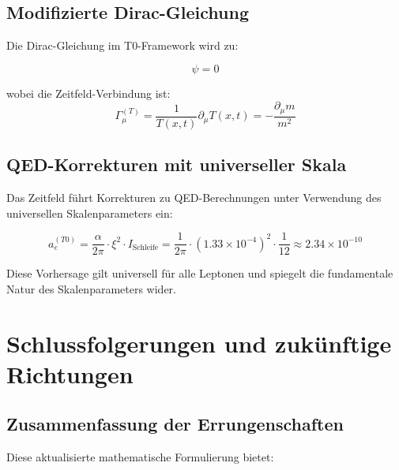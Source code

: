 \documentclass[12pt,a4paper]{article}
\newcommand{\Tfield}{T(x,t)}
\newcommand{\xipar}{\xi}
\theoremstyle{definition}
\theoremstyle{remark}
\begin{document}
	\subsection{Modifizierte Dirac-Gleichung}
	\label{subsec:modifizierte_dirac}
	
	Die Dirac-Gleichung im T0-Framework wird zu:
	
	\begin{equation}
		[i\gamma^{\mu}(\partial_{\mu} + \Gamma_{\mu}^{(T)}) - m(x,t)]\psi = 0
		\label{eq:t0_dirac}
	\end{equation}
	
	wobei die Zeitfeld-Verbindung ist:
	\begin{equation}
		\Gamma_{\mu}^{(T)} = \frac{1}{\Tfield} \partial_{\mu} \Tfield = -\frac{\partial_{\mu} m}{m^2}
		\label{eq:zeitfeld_verbindung}
	\end{equation}
	
	\subsection{QED-Korrekturen mit universeller Skala}
	\label{subsec:qed_korrekturen_universell}
	
	Das Zeitfeld führt Korrekturen zu QED-Berechnungen unter Verwendung des universellen Skalenparameters ein:
	
	\begin{equation}
		a_e^{(T0)} = \frac{\alpha}{2\pi} \cdot \xipar^2 \cdot I_{\text{Schleife}} = \frac{1}{2\pi} \cdot (1.33 \times 10^{-4})^2 \cdot \frac{1}{12} \approx 2.34 \times 10^{-10}
		\label{eq:anomales_moment_korrektur}
	\end{equation}
	
	Diese Vorhersage gilt universell für alle Leptonen und spiegelt die fundamentale Natur des Skalenparameters wider.
	
	\section{Schlussfolgerungen und zukünftige Richtungen}
	\label{sec:schlussfolgerungen}
	
	\subsection{Zusammenfassung der Errungenschaften}
	\label{subsec:zusammenfassung_errungenschaften}
	
	Diese aktualisierte mathematische Formulierung bietet:
	
\end{document}
